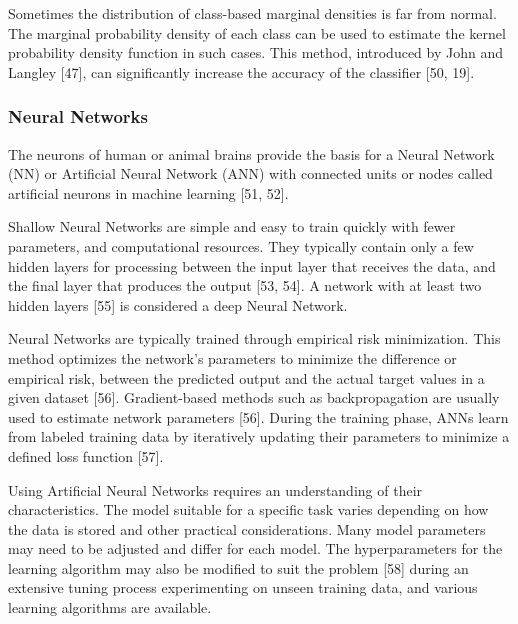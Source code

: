 \documentclass[sn-mathphys-num]{sn-jnl}%
\begin{document}
Sometimes the distribution of class-based marginal densities is far from normal. The marginal probability density of each class can be used to estimate the kernel probability density function in such cases. This method, introduced by John and Langley [47], can significantly increase the accuracy of the classifier [50, 19].

\subsubsection{Neural Networks}

The neurons of human or animal brains provide the basis for a Neural Network (NN) or Artificial Neural Network (ANN) with connected units or nodes called artificial neurons in machine learning [51, 52]. 

Shallow Neural Networks are simple and easy to train quickly with fewer parameters, and computational resources. They typically contain only a few hidden layers for processing between the input layer that receives the data, and the final layer that produces the output [53, 54].  A network with at least two hidden layers [55] is considered a deep Neural Network.

Neural Networks are typically trained through empirical risk minimization. This method optimizes the network's parameters to minimize the difference or empirical risk, between the predicted output and the actual target values in a given dataset [56]. Gradient-based methods such as backpropagation are usually used to estimate network parameters  [56]. During the training phase, ANNs learn from labeled training data by iteratively updating their parameters to minimize a defined loss function [57].

Using Artificial Neural Networks requires an understanding of their characteristics. The model suitable for a specific task varies depending on how the data is stored and other practical considerations. Many model parameters may need to be adjusted and differ for each model. The hyperparameters for the learning algorithm may also be modified to suit the problem [58] during an extensive tuning process experimenting on unseen training data, and various learning algorithms are available.
\end{document}
